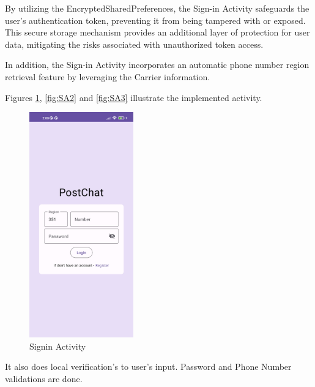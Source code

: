 By utilizing the EncryptedSharedPreferences, the Sign-in Activity safeguards the user's authentication token, preventing it from being tampered with or exposed. This secure storage mechanism provides an additional layer of protection for user data, mitigating the risks associated with unauthorized token access.


In addition, the Sign-in Activity incorporates an automatic phone number region retrieval feature by leveraging the Carrier information.

Figures \ref{fig:SA1}, \ref{fig:SA2} and \ref{fig:SA3} illustrate the implemented activity.


\begin{figure}[!ht]
	\centering
	\includegraphics[trim={0cm -3cm 0 -3cm}, width=0.4\textwidth]{./Chapter6/Figures/Login}
	\caption{Signin Activity}
	\label{fig:SA1}
\end{figure}

\newpage

It also does local verification's to user's input. Password and Phone Number validations are done.

